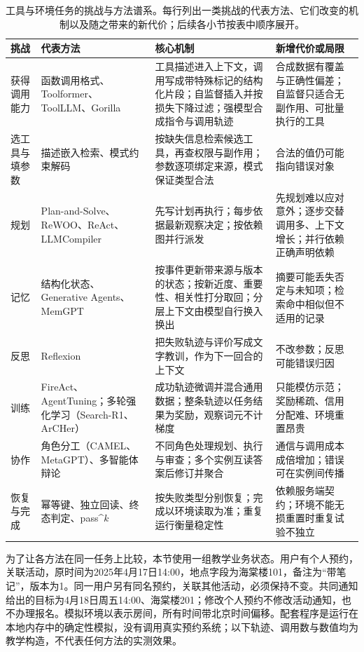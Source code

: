 \begin{table}[htbp]
\centering
\small
\begin{tabular}{p{18mm}p{30mm}p{48mm}p{44mm}}
\toprule
挑战 & 代表方法 & 核心机制 & 新增代价或局限 \\
\midrule
获得调用能力 & 函数调用格式、Toolformer、ToolLLM、Gorilla & 工具描述进入上下文，调用写成带特殊标记的结构化片段；自监督插入并按损失下降过滤；强模型合成指令与调用轨迹 & 合成数据有覆盖与正确性偏差；自监督只适合无副作用、可批量执行的工具 \\
选工具与填参数 & 描述嵌入检索、模式约束解码 & 按缺失信息检索候选工具，再查权限与副作用；参数逐项绑定来源，模式保证类型合法 & 合法的值仍可能指向错误对象 \\
规划 & Plan-and-Solve、ReWOO、ReAct、LLMCompiler & 先写计划再执行；每步依据最新观察决定；按依赖图并行派发 & 先规划难以应对意外；逐步交替调用多、上下文增长；并行依赖正确声明依赖 \\
记忆 & 结构化状态、Generative Agents、MemGPT & 按事件更新带来源与版本的状态；按新近度、重要性、相关性打分取回；分层上下文由模型自行换入换出 & 摘要可能丢失否定与未知项；检索命中相似但不适用的记录 \\
反思 & Reflexion & 把失败轨迹与评价写成文字教训，作为下一回合的上下文 & 不改参数；反思可能错误归因 \\
训练 & FireAct、AgentTuning；多轮强化学习（Search-R1、ArCHer） & 成功轨迹微调并混合通用数据；整条轨迹以任务结果为奖励，观察词元不计梯度 & 只能模仿示范；奖励稀疏、信用分配难、环境重置昂贵 \\
协作 & 角色分工（CAMEL、MetaGPT）、多智能体辩论 & 不同角色处理规划、执行与审查；多个实例互读答案后修订并聚合 & 通信与调用成本成倍增加；错误可在实例间传播 \\
恢复与完成 & 幂等键、独立回读、终态判定、pass\textasciicircum{}$k$ & 按失败类型分别恢复；完成以环境读取为准；重复运行衡量稳定性 & 依赖服务端契约；环境不能无损重置时重复试验不独立 \\
\bottomrule
\end{tabular}
\caption{工具与环境任务的挑战与方法谱系。每行列出一类挑战的代表方法、它们改变的机制以及随之带来的新代价；后续各小节按表中顺序展开。}
\label{tab:nlp-execution-agent-map}
\end{table}

为了让各方法在同一任务上比较，本节使用一组教学业务状态。用户有个人预约，关联活动，原时间为2025年4月17日14:00，地点字段为海棠楼101，备注为“带笔记”，版本为1。同一用户另有同名预约，关联其他活动，必须保持不变。共同通知给出的目标为4月18日周五14:00、海棠楼201；修改个人预约不修改活动通知，也不办理报名。模拟环境以表示房间，所有时间带北京时间偏移。配套程序是运行在本地内存中的确定性模拟，没有调用真实预约系统；以下轨迹、调用数与数值均为教学构造，不代表任何方法的实测效果。


